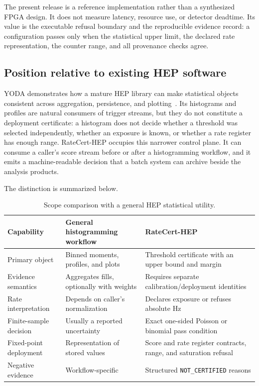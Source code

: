 \documentclass[submission, Phys]{SciPost}
\begin{document}
The present release is a reference implementation rather than a synthesized
FPGA design.  It does not measure latency, resource use, or detector deadtime.
Its value is the executable refusal boundary and the reproducible evidence
record: a configuration passes only when the statistical upper limit, the
declared rate representation, the counter range, and all provenance checks
agree.

\subsection{Position relative to existing HEP software}

YODA demonstrates how a mature HEP library can make statistical objects
consistent across aggregation, persistence, and plotting~\cite{YODA}.  Its
histograms and profiles are natural consumers of trigger streams, but they do
not constitute a deployment certificate: a histogram does not decide whether a
threshold was selected independently, whether an exposure is known, or whether
a rate register has enough range.  RateCert-HEP occupies this narrower control
plane.  It can consume a caller's score stream before or after a histogramming
workflow, and it emits a machine-readable decision that a batch system can
archive beside the analysis products.

The distinction is summarized below.

\begin{table}[t]
\centering\small
\caption{Scope comparison with a general HEP statistical utility.}
\label{tab:scope}
\begin{tabular}{p{}p{}p{}}
\toprule
Capability & General histogramming workflow & RateCert-HEP \\
\midrule
Primary object & Binned moments, profiles, and plots & Threshold certificate with an upper bound and margin \\
Evidence semantics & Aggregates fills, optionally with weights & Requires separate calibration/deployment identities \\
Rate interpretation & Depends on caller's normalization & Declares exposure or refuses absolute Hz \\
Finite-sample decision & Usually a reported uncertainty & Exact one-sided Poisson or binomial pass condition \\
Fixed-point deployment & Representation of stored values & Score and rate register contracts, range, and saturation refusal \\
Negative evidence & Workflow-specific & Structured \texttt{NOT\_CERTIFIED} reasons \\
\bottomrule
\end{tabular}
\end{table}
\end{document}

